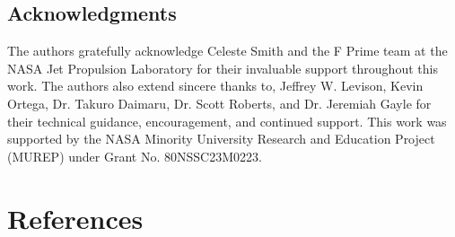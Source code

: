 \documentclass[10pt,letterpaper,twoside,fleqn]{article}
\begin{document}
\subsection{Acknowledgments}

The authors gratefully acknowledge Celeste Smith and the F Prime team at the NASA Jet Propulsion Laboratory for their invaluable support throughout this work. The authors also extend sincere thanks to, Jeffrey W. Levison, Kevin Ortega, Dr. Takuro Daimaru, Dr. Scott Roberts, and Dr. Jeremiah Gayle for their technical guidance, encouragement, and continued support.
This work was supported by the NASA Minority University Research and Education Project (MUREP) under Grant No. 80NSSC23M0223.



\section{References}
\nocite{*}


\end{document}
